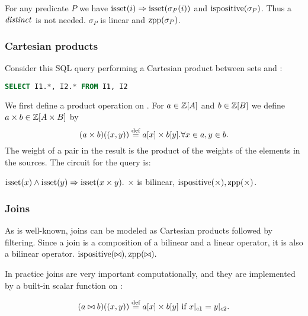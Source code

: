For any predicate $P$ we have $\mbox{isset}(i) \Rightarrow
\mbox{isset}(\sigma_P(i))$ and $\mbox{ispositive}(\sigma_P)$.  Thus a $\mathit{distinct}$
is not needed.  $\sigma_P$ is linear and $\mbox{zpp}(\sigma_P)$.

\subsubsection{Cartesian products}

Consider this SQL query performing a Cartesian product
between sets  and :

\begin{lstlisting}[language=SQL]
SELECT I1.*, I2.* FROM I1, I2
\end{lstlisting}

We first define a product operation on \zrs.
For $a \in \mathbb{Z}[A]$ and $b \in \mathbb{Z}[B]$ we define $a \times b \in \mathbb{Z}[A \times B]$ by
$$(a \times b)((x,y)) \stackrel{\textrm{\scriptsize def}}{=} a[x] \times b[y] . \forall x \in a, y \in b.$$
The weight of a pair in the result is the product of the weights of the
elements in the sources.  The circuit for the query is:

\begin{center}
\end{center}

$\mbox{isset}(x) \land \mbox{isset}(y) \Rightarrow \mbox{isset}(x \times y).$
$\times$ is bilinear, $\mbox{ispositive}(\times), \mbox{zpp}(\times)$.

\subsubsection{Joins}

As is well-known, joins can be modeled as Cartesian products
followed by filtering.  Since a join is a composition of a bilinear
and a linear operator, it is also a bilinear operator.
$\mbox{ispositive}(\bowtie), \mbox{zpp}(\bowtie).$

In practice joins are very important computationally, and they are
implemented by a built-in scalar function on \zrs:

$$(a \bowtie b)((x,y)) \stackrel{\textrm{\scriptsize def}}{=} a[x] \times b[y] \mbox{ if } x|_{c1} = y|_{c2}.$$

